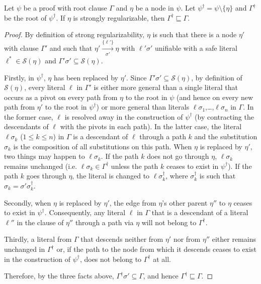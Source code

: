 \begin{thm}\label{thm:correct}
Let $\psi$ be a proof with root clause $\Gamma$ and $\eta$ be a node in $\psi$. Let $\psi^{\dagger} = \psi\setminus \{\eta\}$ and $\Gamma^{\dagger}$ be the root of $\psi^{\dagger}$. If $\eta$ is strongly regularizable, then $\Gamma^{\dagger} \sqsubseteq \Gamma$.
\end{thm}

\begin{proof} 
By definition of strong regularizability, $\eta$ is such
that there is a node $\eta'$ with clause $\Gamma'$ and such that
$\eta' \xrightarrow[\sigma']{\{\ell'\} } \eta$ with $\ell'\sigma'$
unifiable with a safe literal $\ell^*\in \mathcal{S}(\eta)$ and
$\Gamma' \sigma' \subseteq \mathcal{S}(\eta)$.

Firstly, in $\psi^{\dagger}$, $\eta$ has been replaced by $\eta'$. Since
$\Gamma' \sigma' \subseteq \mathcal{S}(\eta)$, by definition of
$\mathcal{S}(\eta)$, every literal $\ell$ in $\Gamma'$ is either more
general than a single literal that occurs as a pivot on every path
from $\eta$ to the root in $\psi$ (and hence on every new path from
$\eta'$ to the root in $\psi^{\dagger}$) or more general than literals
$\ell \sigma_1$,\ldots,$\ell\sigma_n$ in $\Gamma$. In the former case,
$\ell$ is resolved away in the construction of $\psi^{\dagger}$ (by
contracting the descendants of $\ell$ with the pivots in each path).
In the latter case, the literal $\ell \sigma_k$ ($1 \leq k \leq n$) in
$\Gamma$ is a descendant of $\ell$ through a path $k$ and the
substitution $\sigma_k$ is the composition of all substitutions on
this path. When $\eta$ is replaced by $\eta'$, two things may happen
to $\ell \sigma_k$. If the path $k$ does not go through $\eta$, 
$\ell \sigma_k$ remains unchanged (i.e. $\ell \sigma_k \in \Gamma^{\dagger}$
unless the path $k$ ceases to exist in $\psi^{\dagger}$). If the path
$k$ goes through $\eta$, the literal is changed to 
$\ell\sigma^{\dagger}_k$, where $\sigma^{\dagger}_k$ is such that 
$\sigma_k = \sigma' \sigma^{\dagger}_k$.

Secondly, when $\eta$ is replaced by $\eta'$, the edge from
$\eta$'s other parent $\eta''$ to $\eta$ ceases to exist in
$\psi^{\dagger}$. Consequently, any literal $\ell$ in $\Gamma$ that is a
descendant of a literal $\ell''$ in the clause of $\eta''$ through a
path via $\eta$ will not belong to $\Gamma^{\dagger}$.


Thirdly, a literal from $\Gamma$ that descends neither from $\eta'$ nor from $\eta''$ either remains unchanged in $\Gamma^{\dagger}$ or, if the path to the node from which it descends ceases to exist in the construction of $\psi^{\dagger}$, does not belong to $\Gamma^{\dagger}$ at all.

Therefore, by the three facts above, $\Gamma^{\dagger} \sigma' \subseteq \Gamma$, and hence $\Gamma^{\dagger} \sqsubseteq \Gamma$.
\end{proof}


